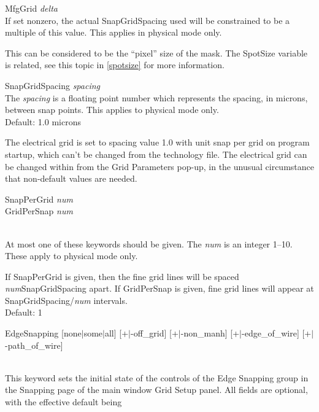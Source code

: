 \begin{description}
\item{\vt MfgGrid} {\it delta}\\
If set nonzero, the actual {\vt SnapGridSpacing} used will be
constrained to be a multiple of this value.  This applies in physical
mode only.

This can be considered to be the ``pixel'' size of the mask.  The {\et
SpotSize} variable is related, see this topic in \ref{spotsize} for
more information.

\item{\vt SnapGridSpacing} {\it spacing}\\
The {\it spacing} is a floating point number which represents the
spacing, in microns, between snap points.  This applies to physical
mode only.\\
Default: 1.0 microns    

The electrical grid is set to spacing value 1.0 with unit snap per
grid on program startup, which can't be changed from the technology
file.  The electrical grid can be changed within {\Xic} from the {\cb
Grid Parameters} pop-up, in the unusual circumstance that non-default
values are needed.

\item\parbox[b]{4in}{{\vt SnapPerGrid} {\it num}\\
{\vt GridPerSnap} {\it num}}\\
At most one of these keywords should be given.  The {\it num} is an
integer 1--10.  These apply to physical mode only.

If {\vt SnapPerGrid} is given, then the fine grid lines will be spaced
{\it num\/}{\vt *SnapGridSpacing} apart.  If {\vt GridPerSnap} is
given, fine grid lines will appear at {\vt SnapGridSpacing/}{\it num}
intervals.\\
Default: 1

\item\parbox[b]{6in}{{\vt EdgeSnapping} [{\vt none}$|${\vt some}$|${\vt all}]
  [{\vt +}$|${\vt -off\_grid}]      [{\vt +}$|${\vt -non\_manh}]
  [{\vt +}$|${\vt -edge\_of\_wire}] [{\vt +}$|${\vt -path\_of\_wire}]}\\
This keyword sets the initial state of the controls of the {\cb Edge
Snapping} group in the {\cb Snapping} page of the main window {\cb
Grid Setup} panel.  All fields are optional, with the effective
default being


\end{description}
